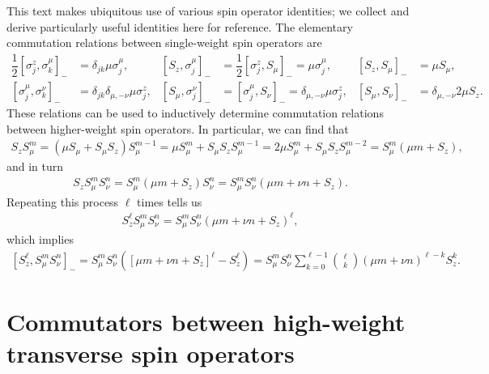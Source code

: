 \documentclass[aps,notitlepage,nofootinbib,11pt]{revtex4-1}
\newcommand{\f}[2]{\dfrac{#1}{#2}} %
\newcommand{\p}[1]{\left(#1\right)} %
\renewcommand{\sp}[1]{\left[#1\right]} %
\newcommand{\1}{\mathds{1}}
\begin{document}
This text makes ubiquitous use of various spin operator identities; we
collect and derive particularly useful identities here for reference.
The elementary commutation relations between single-weight spin
operators are
\begin{align}
  \f12 \sp{\sigma_j^z,\sigma_k^\mu}_-
  &= \delta_{jk} \mu \sigma_j^\mu,
  &
  \sp{S_z,\sigma_j^\mu}_-
  &= \f12 \sp{\sigma_j^z,S_\mu}_- = \mu \sigma_j^\mu,
  &
  \sp{S_z,S_\mu}_-
  &= \mu S_\mu,
  \label{eq:comm_z_mu} \\
  \sp{\sigma_j^\mu,\sigma_k^\nu}_-
  &= \delta_{jk} \delta_{\mu,-\nu} \mu \sigma_j^z,
  &
  \sp{S_\mu,\sigma_j^\nu}_-
  &= \sp{\sigma_j^\mu,S_\nu}_-
  = \delta_{\mu,-\nu} \mu \sigma_j^z,
  &
  \sp{S_\mu,S_\nu}_-
  &= \delta_{\mu,-\nu} 2 \mu S_z.
  \label{eq:comm_mu_nu}
\end{align}
These relations can be used to inductively determine commutation
relations between higher-weight spin operators.  In particular, we can
find that
\begin{align}
  S_z S_\mu^m
  = \p{\mu S_\mu + S_\mu S_z} S_\mu^{m-1}
  = \mu S_\mu^m + S_\mu S_z S_\mu^{m-1}
  = 2 \mu S_\mu^m + S_\mu S_z S_\mu^{m-2}
  = S_\mu^m \p{\mu m + S_z},
  \label{eq:push_z_mu}
\end{align}
and in turn
\begin{align}
  S_z S_\mu^m S_\nu^n
  = S_\mu^m \p{\mu m + S_z} S_\nu^n
  = S_\mu^m S_\nu^n \p{\mu m + \nu n + S_z}.
  \label{eq:push_z_mu_nu}
\end{align}
Repeating this process $\ell$ times tells us
\begin{align}
  S_z^\ell S_\mu^m S_\nu^n
  = S_\mu^m S_\nu^n \p{\mu m + \nu n + S_z}^\ell,
\end{align}
which implies
\begin{align}
  \sp{S_z^\ell, S_\mu^m S_\nu^n}_-
  = S_\mu^m S_\nu^n \p{\sp{\mu m + \nu n + S_z}^\ell - S_z^\ell}
  = S_\mu^m S_\nu^n  \sum_{k=0}^{\ell-1} {\ell \choose k}
  \p{\mu m + \nu n}^{\ell-k} S_z^k.
  \label{eq:comm_z_mu_nu_pow}
\end{align}


\section{Commutators between high-weight transverse spin operators}
\end{document}
